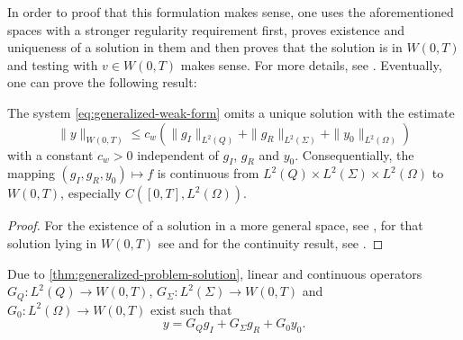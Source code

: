 \documentclass[../thesis.tex]{subfiles}
\begin{document}
In order to proof that this formulation makes sense, one uses the aforementioned spaces with a stronger regularity requirement first, proves existence and uniqueness of a solution in them and then proves that the solution is in $W(0, T)$ and testing with $v \in W(0, T)$ makes sense. For more details, see \cite[3.3 Schwache Lösungen in $W^{1, 0}_2(Q)$]{Troeltzsch}.
Eventually, one can prove the following result:
\begin{theorem}
\label{thm:generalized-problem-solution}
The system \cref{eq:generalized-weak-form} omits a unique solution with the estimate
\[
	\| y \|_{W(0, T)} \leq c_w ( \| g_I \|_{L^2(Q)} + \| g_R \|_{L^2(\Sigma)} + \| y_0 \|_{L^2(\Omega)} )
\] 
with a constant $c_w > 0$ independent of $g_I$, $g_R$ and $y_0$.
Consequentially, the mapping $(g_I, g_R, y_0) \mapsto f$ is continuous from $L^2(Q) \times L^2(\Sigma) \times L^2(\Omega)$ to $W(0, T)$, especially $C([0, T], L^2(\Omega))$.
\end{theorem}
\begin{proof}
For the existence of a solution in a more general space, see \cite[Satz 3.9, p.\ 112]{Troeltzsch}, for that solution lying in $W(0, T)$ see \cite[Satz 3.12, p.\ 120]{Troeltzsch} and for the continuity result, see \cite[Satz 3.13, p.\ 121]{Troeltzsch}.
\end{proof}
Due to \cref{thm:generalized-problem-solution}, linear and continuous operators $G_Q : L^2(Q) \to W(0, T)$, $G_\Sigma : L^2(\Sigma) \to W(0, T)$ and $G_0 : L^2(\Omega) \to W(0, T)$ exist such that
\[
	y = G_Q g_I + G_\Sigma g_R + G_0 y_0.
\]
\end{document}
